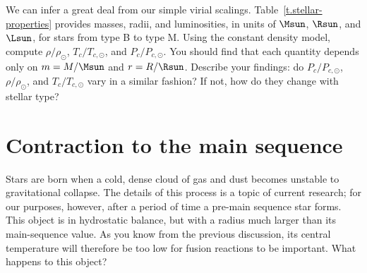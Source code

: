 \begin{exercisebox}\label{ex.stellar-properties}
We can infer a great deal from our simple virial scalings. Table~\ref{t.stellar-properties} provides masses, radii, and luminosities, in units of $\Msun$, $\Rsun$, and $\Lsun$, for stars from type B to type M.  
Using the constant density model, compute $\rho/\rho_{\odot}$, $T_{c}/T_{c,\odot}$, and $P_{c}/P_{c,\odot}$. You should find that each quantity depends only on $m=M/\Msun$ and $r=R/\Rsun$. Describe your findings: do $P_{c}/P_{c,\odot}$, $\rho/\rho_{\odot}$, and $T_{c}/T_{c,\odot}$ vary in a similar fashion? If not, how do they change with stellar type?
\end{exercisebox}


\section{Contraction to the main sequence}
\label{s.stellar-contraction}

Stars are born when a cold, dense cloud of gas and dust becomes unstable to gravitational collapse. The details of this process is a topic of current research; for our purposes, however, after a period of time a pre-main sequence star forms.  This object is in hydrostatic balance, but with a radius much larger than its main-sequence value.  As you know from the previous discussion, its central temperature will therefore be too low for fusion reactions to be important.  What happens to this object?

